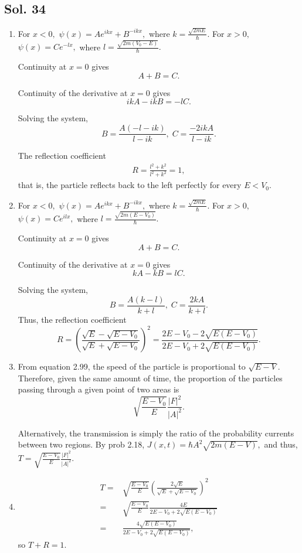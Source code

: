     \subsection*{Sol. 34}
    \begin{enumerate}
        \item For $x<0,$ $\psi(x)=Ae^{ikx}+B^{-ikx},$ where $k=\frac{\sqrt{2mE}}{\hbar}.$ 
        For $x>0,$ $\psi(x)=Ce^{-lx},$ where $l=\frac{\sqrt{2m(V_0-E)}}{\hbar}.$

        Continuity at $x=0$ gives
        $$
        A+B = C.
        $$

        Continuity of the derivative at $x=0$ gives
        $$
        ikA-ikB = -lC.
        $$

        Solving  the system,
        $$
        B = \frac{A(-l-ik)}{l-ik},\;C=\frac{-2ikA}{l-ik}.
        $$

        The reflection coefficient 
        \begin{align*}
            R=\frac{l^2+k^2}{l^2+k^2} = 1,
        \end{align*}
        that is, the particle reflects back to the left perfectly for every $E<V_0.$

        \item For $x<0,$ $\psi(x)=Ae^{ikx}+B^{-ikx},$ where $k=\frac{\sqrt{2mE}}{\hbar}.$ 
        For $x>0,$ $\psi(x)=Ce^{ilx},$ where $l=\frac{\sqrt{2m(E-V_0)}}{\hbar}.$

        Continuity at $x=0$ gives
        $$
        A+B = C.
        $$

        Continuity of the derivative at $x=0$ gives
        $$
        kA-kB = lC.
        $$

        Solving  the system,
        $$
        B = \frac{A(k-l)}{k+l},\;C=\frac{2kA}{k+l}.
        $$
        Thus, the reflection coefficient
        $$
        R = \left(\frac{\sqrt{E}-\sqrt{E-V_0}}{\sqrt{E}+\sqrt{E-V_0}}\right)^2
        =\frac{2E-V_0-2\sqrt{E(E-V_0)}}{2E-V_0+2\sqrt{E(E-V_0)}}.
        $$

    \item From equation 2.99, the speed of the particle is proportional to $\sqrt{E-V}.$ Therefore, given the same amount of time, the proportion of the particles passing through a given point of two areas is
    $$
    \sqrt{\frac{E-V_0}{E}}\frac{|F|^2}{|A|^2}.
    $$

    Alternatively, the transmission is simply the ratio of the probability currents between two regions. By prob 2.18,
    $J(x,t)=\hbar A^2\sqrt{2m(E-V)},$ and thus, $T=\sqrt{\frac{E-V_0}{E}}\frac{|F|^2}{|A|^2}.$
    \item 
    \begin{align*}
    T = &  \sqrt{\frac{E-V_0}{E}}\left(\frac{2\sqrt{E}}{\sqrt{E}+\sqrt{E-V_0}}\right)^2 \\
    =&  \sqrt{\frac{E-V_0}{E}}\frac{4E}{2E-V_0+2\sqrt{E(E-V_0)}}\\
    = & \frac{4\sqrt{E(E-V_0)}}{2E-V_0+2\sqrt{E(E-V_0)}},
    \end{align*}
    so $T+R=1.$
    
    
        
    \end{enumerate}

